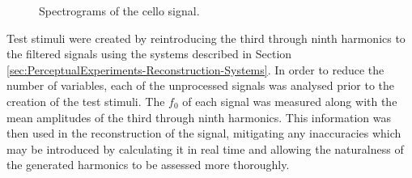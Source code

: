 			\begin{figure}[h!]
				\centering
				\quad
				\caption{Spectrograms of the cello signal.}
				\label{fig:CelloSpectrograms}
			\end{figure}

			Test stimuli were created by reintroducing the third through ninth harmonics to the filtered
			signals using the systems described in Section
			\ref{sec:PerceptualExperiments-Reconstruction-Systems}. In order to reduce the number of variables,
			each of the unprocessed signals was analysed prior to the creation of the test stimuli. The $f_{0}$
			of each signal was measured along with the mean amplitudes of the third through ninth harmonics.
			This information was then used in the reconstruction of the signal, mitigating any inaccuracies
			which may be introduced by calculating it in real time and allowing the naturalness of the
			generated harmonics to be assessed more thoroughly.

